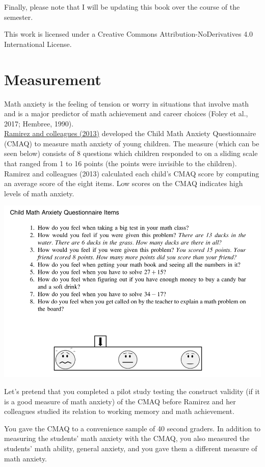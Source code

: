 \documentclass[
]{book}
\begin{document}
Finally, please note that I will be updating this book over the course of the semester.

This work is licensed under a Creative Commons Attribution-NoDerivatives 4.0 International License.

\hypertarget{measurement}{%
\chapter{Measurement}\label{measurement}}

Math anxiety is the feeling of tension or worry in situations that involve math and is a major predictor of math achievement and career choices (Foley et al., 2017; Hembree, 1990).\\
\href{https://drive.google.com/file/d/1VvSqWL7W4mvA5MtDAF94GclVIemC_a9P/view?usp=sharing}{Ramirez and colleagues (2013)} developed the Child Math Anxiety Questionnaire (CMAQ) to measure math anxiety of young children. The measure (which can be seen below) consists of 8 questions which children responded to on a sliding scale that ranged from 1 to 16 points (the points were invisible to the children). Ramirez and colleagues (2013) calculated each child's CMAQ score by computing an average score of the eight items. Low scores on the CMAQ indicates high levels of math anxiety.

\includegraphics{img/cmaq.png}

Let's pretend that you completed a pilot study testing the construct validity (if it is a good measure of math anxiety) of the CMAQ before Ramirez and her colleagues studied its relation to working memory and math achievement.

You gave the CMAQ to a convenience sample of 40 second graders. In addition to measuring the students' math anxiety with the CMAQ, you also measured the students' math ability, general anxiety, and you gave them a different measure of math anxiety.
\end{document}
